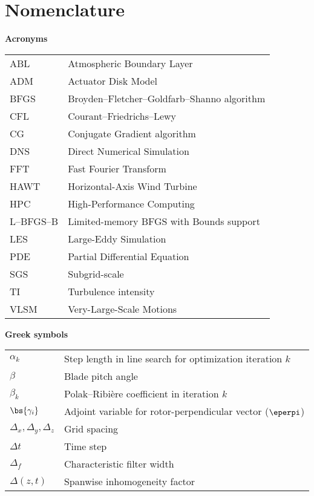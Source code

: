 \chapter*{Nomenclature}

\textbf{Acronyms}

\begin{tabular}{ p{2cm}  l }
	ABL  & Atmospheric Boundary Layer\\
	ADM  & Actuator Disk Model\\
	BFGS & Broyden--Fletcher--Goldfarb--Shanno algorithm\\
	CFL  & Courant--Friedrichs--Lewy\\
	CG   & Conjugate Gradient algorithm\\
	DNS  & Direct Numerical Simulation\\
	FFT  & Fast Fourier Transform\\
	HAWT & Horizontal-Axis Wind Turbine\\
	HPC  & High-Performance Computing\\
	L--BFGS--B & Limited-memory BFGS with Bounds support\\
	LES  & Large-Eddy Simulation\\
	PDE  & Partial Differential Equation\\
	SGS  & Subgrid-scale\\
	TI   & Turbulence intensity\\
	VLSM & Very-Large-Scale Motions\\
\end{tabular}

\textbf{Greek symbols}

\begin{tabular}{ p{2cm}  l }
	$\alpha_k$       & Step length in line search for optimization iteration $k$\\
	$\beta$			 & Blade pitch angle\\
	$\beta_k$		 & Polak--Ribi\`ere coefficient in iteration $k$\\
	$\bs{\gamma_i}$  & Adjoint variable for rotor-perpendicular vector ($\eperpi$)\\
	$\Delta_x,\Delta_y,\Delta_z$   & Grid spacing\\
	$\Delta t$       & Time step\\
	$\Delta_f$       & Characteristic filter width\\
	$\Delta(z,t)$    & Spanwise inhomogeneity factor\\
\end{tabular}

